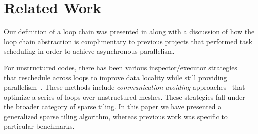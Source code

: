 %
%



\section{Related Work}
\label{sec:relatedwork}
Our definition of a loop chain was presented in \cite{ST-KriegerHIPS2013} along with a discussion of how the loop chain abstraction is complimentary to previous projects that performed task scheduling in order to achieve asynchronous parallelism. 

For unstructured codes, there has been various inspector/executor strategies~\citep{ST-Saltz91} that reschedule across loops to improve data locality while still providing parallelism~\citep{ST-dimeEtna00,ST-StroutLCPC2002,ST-Demmel08,ST-KriegerIAAA2012}. These methods include \emph{communication avoiding} approaches~\citep{ST-commAvoidingSparse2009} that optimize a series of loops over unstructured meshes. These strategies fall under the broader category of sparse tiling. In this paper we have presented a generalized sparse tiling algorithm, whereas previous work was specific to particular benchmarks.

